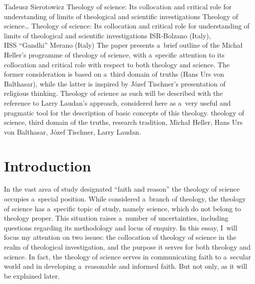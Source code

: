 \begin{artengenv}{Tadeusz Sierotowicz}
	{Theology of science: Its collocation and critical role for understanding of limits of theological and scientific investigations}
	{Theology of science\ldots}
	{Theology of science: Its collocation and critical role for understanding of limits of theological and scientific investigations}
	{ISR-Bolzano (Italy),\\IISS ``Gandhi'' Merano (Italy)}
	{The paper presents a~brief outline of the Michał Heller's programme of theology of science, with a~specific attention to its collocation and critical role with respect to both theology and science. The former consideration is based on a~third domain of truths (Hans Urs von Balthasar), while the latter is inspired by Józef Tischner's presentation of religious thinking. Theology of science as such will be described with the reference to Larry Laudan's approach, considered here as a~very useful and pragmatic tool for the description of basic concepts of this theology.
	}
	{theology of science, third domain of the truths, research tradition, Michał Heller, Hans Urs von Balthasar, Józef Tischner, Larry Laudan.}





\section{Introduction }

\lettrine[loversize=0.13,lines=2,lraise=-0.03,nindent=0em,findent=0.2pt]%
{I}{}n the vast area of study designated ``faith and reason'' the theology of science occupies a~special position. While considered a~branch of theology, the theology of science has a~specific topic of study, namely science, which do not belong to theology proper. This situation raises a~number of uncertainties, including questions regarding its methodology and locus of enquiry. In this essay, I~will focus my attention on two issues: the collocation of theology of science in the realm of theological investigation, and the purpose it serves for both theology and science. In fact, the theology of science serves in communicating faith to a~secular world and in developing a~reasonable and informed faith. But not only, as it will be explained later.




\end{artengenv}
